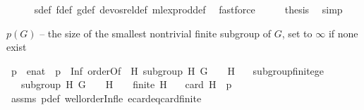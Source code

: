 \begin{isabellebody}
\ \ \ \ \isamarkupfalse%
\ s{\isacharunderscore}{\kern0pt}def\ f{\isacharunderscore}{\kern0pt}def\ g{\isacharunderscore}{\kern0pt}def\ devos{\isacharunderscore}{\kern0pt}rel{\isacharunderscore}{\kern0pt}def\ mlex{\isacharunderscore}{\kern0pt}prod{\isacharunderscore}{\kern0pt}def\ \isamarkupfalse%
\ fastforce\isanewline
\ \ \isamarkupfalse%
\ \isamarkupfalse%
\ {\isacharquery}{\kern0pt}thesis\ \isamarkupfalse%
\ simp\isanewline
{}\isamarkupfalse%
%
\endisatagproof
{\isafoldproof}%
%
\isadelimproof
%
\endisadelimproof
%
\isadelimdocument
%
\endisadelimdocument
%
\isatagdocument
%
\isamarkuptrue%
%
\endisatagdocument
{\isafolddocument}%
%
\isadelimdocument
%
\endisadelimdocument
%
\begin{isamarkuptext}%
$p(G)$ -- the size of the smallest nontrivial finite subgroup of $G$, set to $\infty$ if none exist%
\end{isamarkuptext}\isamarkuptrue%
\isamarkupfalse%
\ p\ {\isacharcolon}{\kern0pt}{\isacharcolon}{\kern0pt}\ enat\ \ {\isachardoublequoteopen}p\ {\isacharequal}{\kern0pt}\ Inf\ {\isacharparenleft}{\kern0pt}orderOf\ {\isacharbackquote}{\kern0pt}\ {\isacharbraceleft}{\kern0pt}H{\isachardot}{\kern0pt}\ subgroup\ H\ G\ {\isacharparenleft}{\kern0pt}{\isasymcdot}{\isacharparenright}{\kern0pt}\ {\isasymone}\ {\isasymand}\ H\ {\isasymnoteq}\ {\isacharbraceleft}{\kern0pt}{\isasymone}{\isacharbraceright}{\kern0pt}{\isacharbraceright}{\kern0pt}{\isacharparenright}{\kern0pt}{\isachardoublequoteclose}\isanewline
\isanewline
{}\isamarkupfalse%
\ subgroup{\isacharunderscore}{\kern0pt}finite{\isacharunderscore}{\kern0pt}ge{\isacharcolon}{\kern0pt}\isanewline
\ \ \ {\isachardoublequoteopen}subgroup\ H\ G\ {\isacharparenleft}{\kern0pt}{\isasymcdot}{\isacharparenright}{\kern0pt}\ {\isasymone}{\isachardoublequoteclose}\ \ {\isachardoublequoteopen}H\ {\isasymnoteq}\ {\isacharbraceleft}{\kern0pt}{\isasymone}{\isacharbraceright}{\kern0pt}{\isachardoublequoteclose}\ \ {\isachardoublequoteopen}finite\ H{\isachardoublequoteclose}\isanewline
\ \ \ {\isachardoublequoteopen}card\ H\ {\isasymge}\ p{\isachardoublequoteclose}\isanewline
%
\isadelimproof
\ \ %
\endisadelimproof
%
\isatagproof
{}\isamarkupfalse%
\ assms\ p{\isacharunderscore}{\kern0pt}def\ wellorder{\isacharunderscore}{\kern0pt}Inf{\isacharunderscore}{\kern0pt}le{}\ ecard{\isacharunderscore}{\kern0pt}eq{\isacharunderscore}{\kern0pt}card{\isacharunderscore}{\kern0pt}finite\isanewline

\end{isabellebody}
